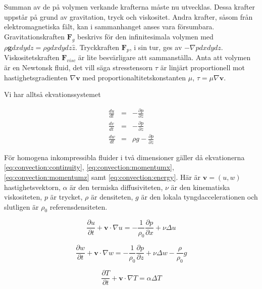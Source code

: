 Summan av de på volymen verkande krafterna måste nu utvecklas. Dessa krafter uppstår på grund av gravitation, tryck och viskositet. Andra krafter, såsom från elektromagnetiska fält, kan i sammanhanget anses vara försumbara. Gravitationskraften $\mathbf{F}_g$ beskrivs för den infinitesimala volymen med $\rho \mathbf{g} dxdydz = \rho g dxdydz \hat{z}$. Tryckkraften $\mathbf{F}_p$, i sin tur, ges av $-\nabla p dxdydz$. Viskositetskraften $\mathbf{F}_{visc}$ är lite besvärligare att sammanställa. Anta att volymen är en Newtonsk fluid, det vill säga stresstensorn $\tau$ är linjärt proportionell mot hastighetsgradienten $\nabla\mathbf{v}$ med proportionaltitetskonstanten $\mu$, $\tau = \mu \nabla \mathbf{v}$. 


Vi har alltså ekvationssystemet

\begin{eqnarray}
\frac{du}{dt} & = & -\frac{\partial p}{\partial z} \nonumber\\
\frac{dv}{dt} & = & -\frac{\partial p}{\partial z}\\
\frac{dw}{dt} & = & \rho g -\frac{\partial p}{\partial z} \nonumber
\end{eqnarray}


För homogena inkompressibla fluider i två dimensioner gäller då ekvationerna
\eqref{eq:convection:continuity}, \eqref{eq:convection:momentumx},
\eqref{eq:convection:momentumz} samt \eqref{eq:convection:energy}. Här
är $\mathbf{v} = (u,w)$ hastighetsvektorn, $\alpha$ är den termiska
diffusiviteten, $\nu$ är den kinematiska viskositeten, $p$ är trycket,
$\rho$ är densiteten, $g$ är den lokala tyngdaccelerationen
och slutligen är $\rho_0$ referensdensiteten.

\begin{equation}
\label{eq:convection:momentumx}
\frac{\partial u}{\partial t} + \mathbf{v}\cdot\nabla u = 
-\frac{1}{\rho_0}\frac{\partial p}{\partial x} + 
\nu\Delta u
\end{equation}

\begin{equation}
\label{eq:convection:momentumz}
\frac{\partial w}{\partial t} + \mathbf{v}\cdot\nabla w = 
-\frac{1}{\rho_0}\frac{\partial p}{\partial z} + \nu\Delta w - \frac{\rho}{\rho_0}g
\end{equation}

\begin{equation}
\label{eq:convection:energy}
\frac{\partial T}{\partial t} + \mathbf{v}\cdot\nabla T = \alpha\Delta T
\end{equation}

